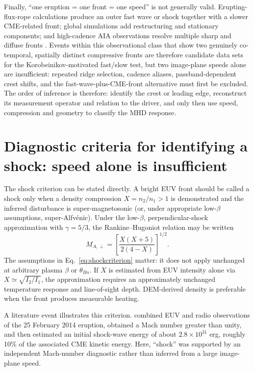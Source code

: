 \documentclass[11pt]{article}
\let\parencite\citep
\let\textcite\citet
\begin{document}
Finally, ``one eruption = one front = one speed'' is not generally valid. Erupting-flux-rope calculations produce an outer fast wave or shock together with a slower CME-related front; global simulations add restructuring and stationary components; and high-cadence AIA observations resolve multiple sharp and diffuse fronts \parencite{Chen2002,Chen2005,Cohen2009,Liu2010,Liu2012}. Events within this observational class that show two genuinely co-temporal, spatially distinct compressive fronts are therefore candidate data sets for the Korobeinikov-motivated fast/slow test, but two image-plane speeds alone are insufficient: repeated ridge selection, cadence aliases, passband-dependent crest shifts, and the fast-wave-plus-CME-front alternative must first be excluded. The order of inference is therefore: identify the crest or leading edge, reconstruct its measurement operator and relation to the driver, and only then use speed, compression and geometry to classify the MHD response.

\section{Diagnostic criteria for identifying a shock: speed alone is insufficient}
The shock criterion can be stated directly. A bright EUV front should be called a shock only when a density compression $X=n_2/n_1>1$ is demonstrated and the inferred disturbance is super-magnetosonic (or, under appropriate low-$\beta$ assumptions, super-Alfv\'enic). Under the low-$\beta$, perpendicular-shock approximation with $\gamma=5/3$, the Rankine--Hugoniot relation may be written \parencite{Vrsnak2002}
\begin{equation}
 M_{A,\perp}=\left[\frac{X(X+5)}{2(4-X)}\right]^{1/2}.
 \label{eq:shockcriterion}
\end{equation}
The assumptions in Eq.~\eqref{eq:shockcriterion} matter: it does not apply unchanged at arbitrary plasma $\beta$ or $\theta_{Bn}$. If $X$ is estimated from EUV intensity alone via $X\simeq\sqrt{I_2/I_1}$, the approximation requires an approximately unchanged temperature response and line-of-sight depth. DEM-derived density is preferable when the front produces measurable heating.

A literature event illustrates this criterion. \textcite{Long2015Energy} combined EUV and radio observations of the 25 February 2014 eruption, obtained a Mach number greater than unity, and then estimated an initial shock-wave energy of about $2.8\times10^{31}$ erg, roughly 10\% of the associated CME kinetic energy. Here, ``shock'' was supported by an independent Mach-number diagnostic rather than inferred from a large image-plane speed.
\end{document}
